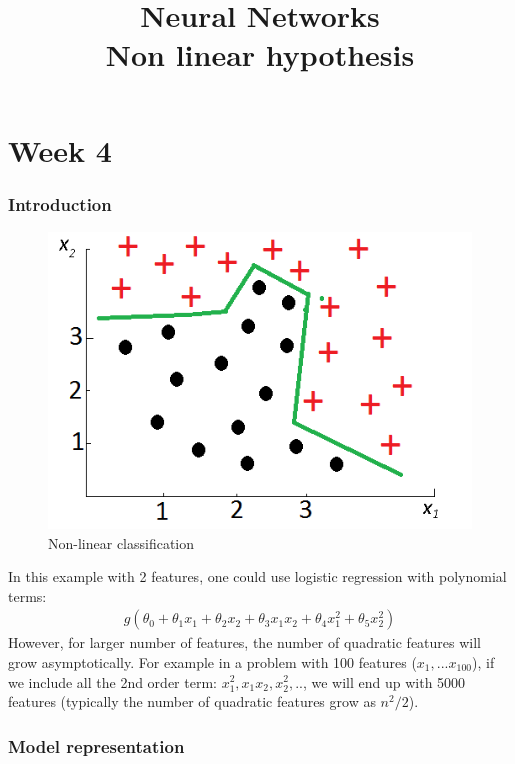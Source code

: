 \documentclass[a4paper,12pt]{report}
\begin{document}
\tableofcontents

\title{Neural Networks \\ Non linear hypothesis}
\maketitle
\part{Week 4}
\section{Introduction}

\begin{figure}[H]
\centering
        \includegraphics[totalheight=3 cm]{example.png}
				\caption{Non-linear classification}
\end{figure}
In this example with 2 features, one could use logistic regression with polynomial terms:
\begin{align*}
g(\theta_0 + \theta_1 x_1 + \theta_2 x_2 + \theta_3 x_1 x_2 + \theta_4 x_1 ^2 + \theta_5 x_2 ^2) 
\end{align*}
However, for larger number of features, the number of quadratic features will grow asymptotically. For example in a problem with 100 features ($x_1, ...x_{100}$), if we include all the 2nd order term: $x_1 ^2, x_1 x_2, x_2 ^{2},..$, we will end up with 5000 features (typically the number of quadratic features grow as $n^2 /2$).

\section{Model representation}
\end{document}
